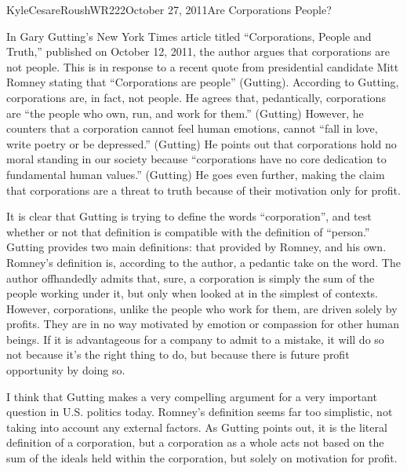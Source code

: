 \documentclass[12pt,letterpaper]{article}
\begin{document}
\begin{mla}{Kyle}{Cesare}{Roush}{WR222}{October 27, 2011}{Are Corporations
People?}

In Gary Gutting's New York Times article titled ``Corporations, People and
Truth,'' published on October 12, 2011, the author argues that corporations are
not people.  This is in response to a recent quote from presidential candidate
Mitt Romney stating that ``Corporations are people'' (Gutting).  According to
Gutting, corporations are, in fact, not people.  He agrees that, pedantically,
corporations are ``the people who own, run, and work for them.'' (Gutting)
However, he counters that a corporation cannot feel human emotions, cannot
``fall in love, write poetry or be depressed.'' (Gutting)  He points out that
corporations hold no moral standing in our society because ``corporations have
no core dedication to fundamental human values.'' (Gutting)  He goes even
further, making the claim that corporations are a threat to truth because of
their motivation only for profit.

It is clear that Gutting is trying to define the words ``corporation'', and test
whether or not that definition is compatible with the definition of ``person.''
Gutting provides two main definitions: that provided by Romney, and his own.
Romney's definition is, according to the author, a pedantic take on the word.
The author offhandedly admits that, sure, a corporation is simply the sum of the
people working under it, but only when looked at in the simplest of contexts.
However, corporations, unlike the people who work for them, are driven solely by
profits.  They are in no way motivated by emotion or compassion for other human
beings.  If it is advantageous for a company to admit to a mistake, it will do
so not because it's the right thing to do, but because there is future profit
opportunity by doing so.

I think that Gutting makes a very compelling argument for a very important
question in U.S. politics today.  Romney's definition seems far too simplistic,
not taking into account any external factors.  As Gutting points out, it is the
literal definition of a corporation, but a corporation as a whole acts not based
on the sum of the ideals held within the corporation, but solely on motivation
for profit.


\end{mla}
\end{document}
